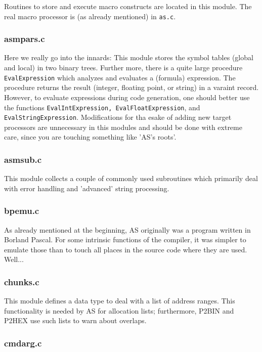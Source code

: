 \documentclass[12pt,twoside]{report}
\newcommand{\tty}[1]{{\tt #1}}
\newcommand{\asname}{{AS}}
\begin{document}
Routines to store and execute macro constructs are located in this module.
The real macro processor is (as already mentioned) in {\tt as.c}.

\subsubsection{asmpars.c}

Here we really go into the innards: This module stores the symbol tables
(global and local) in two binary trees.  Further more, there is a quite
large procedure {\tt EvalExpression} which analyzes and evaluates a (formula)
expression.  The procedure returns the result (integer, floating point, or
string) in a varaint record.  However, to evaluate expressions during code
generation, one should better use the functions  \tty{EvalIntExpression,
EvalFloatExpression}, and \tty{EvalStringExpression}.  Modifications for
tha esake of adding new target processors are unnecessary in this modules
and should be done with extreme care, since you are touching something
like '\asname{}'s roots'.

\subsubsection{asmsub.c}

This module collects a couple of commonly used subroutines which primarily
deal with error handling and 'advanced' string processing.

\subsubsection{bpemu.c}

As already mentioned at the beginning, \asname{} originally was a program written
in Borland Pascal.  For some intrinsic functions of the compiler, it was
simpler to emulate those than to touch all places in the source code where
they are used.  Well...

\subsubsection{chunks.c}

This module defines a data type to deal with a list of address ranges.
This functionality is needed by \asname{} for allocation lists; furthermore,
P2BIN and P2HEX use such lists to warn about overlaps.

\subsubsection{cmdarg.c}
\end{document}
